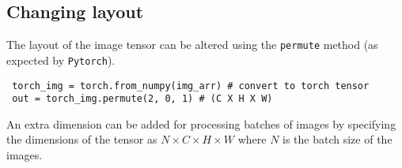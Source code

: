 \documentclass[11pt]{article}
\begin{document}
\subsection{Changing layout}
\label{sec:orgd635603}
The layout of the image tensor can be altered using the \texttt{permute} method (as expected by \texttt{Pytorch}).
\begin{verbatim}
 torch_img = torch.from_numpy(img_arr) # convert to torch tensor
 out = torch_img.permute(2, 0, 1) # (C X H X W)
\end{verbatim}
An extra dimension can be added for processing batches of images by specifying the dimensions of the tensor as \(N\times C\times H\times W\) where \(N\) is the batch size of the images.
\end{document}
